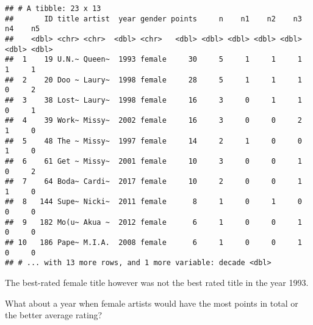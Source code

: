 \documentclass[
]{article}
\newenvironment{Shaded}{\begin{snugshade}}{\end{snugshade}}
\newcommand{\DataTypeTok}[1]{\textcolor[rgb]{0.13,0.29,0.53}{#1}}
\newcommand{\DecValTok}[1]{\textcolor[rgb]{0.00,0.00,0.81}{#1}}
\newcommand{\KeywordTok}[1]{\textcolor[rgb]{0.13,0.29,0.53}{\textbf{#1}}}
\newcommand{\NormalTok}[1]{#1}
\newcommand{\OperatorTok}[1]{\textcolor[rgb]{0.81,0.36,0.00}{\textbf{#1}}}
\newcommand{\StringTok}[1]{\textcolor[rgb]{0.31,0.60,0.02}{#1}}
\begin{document}
\begin{verbatim}
## # A tibble: 23 x 13
##       ID title artist  year gender points     n    n1    n2    n3    n4    n5
##    <dbl> <chr> <chr>  <dbl> <chr>   <dbl> <dbl> <dbl> <dbl> <dbl> <dbl> <dbl>
##  1    19 U.N.~ Queen~  1993 female     30     5     1     1     1     1     1
##  2    20 Doo ~ Laury~  1998 female     28     5     1     1     1     0     2
##  3    38 Lost~ Laury~  1998 female     16     3     0     1     1     0     1
##  4    39 Work~ Missy~  2002 female     16     3     0     0     2     1     0
##  5    48 The ~ Missy~  1997 female     14     2     1     0     0     1     0
##  6    61 Get ~ Missy~  2001 female     10     3     0     0     1     0     2
##  7    64 Boda~ Cardi~  2017 female     10     2     0     0     1     1     0
##  8   144 Supe~ Nicki~  2011 female      8     1     0     1     0     0     0
##  9   182 Mo(u~ Akua ~  2012 female      6     1     0     0     1     0     0
## 10   186 Pape~ M.I.A.  2008 female      6     1     0     0     1     0     0
## # ... with 13 more rows, and 1 more variable: decade <dbl>
\end{verbatim}

The best-rated female title however was not the best rated title in the
year 1993.

What about a year when female artists would have the most points in
total or the better average rating?

\begin{Shaded}
\end{Shaded}
\end{document}
